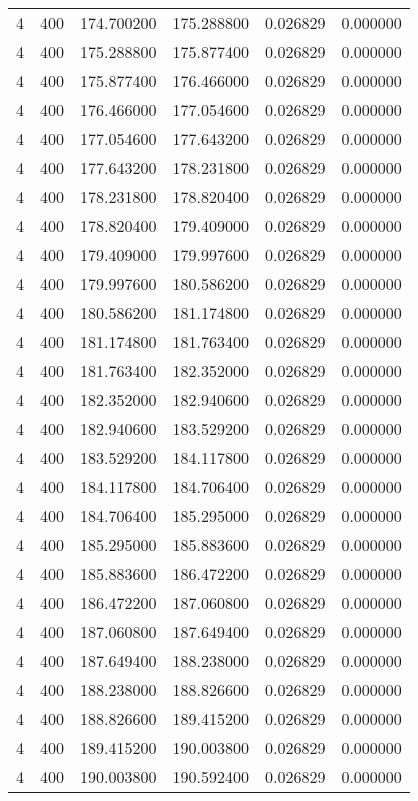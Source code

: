\begin{longtable}{rrrrrr}
4 & 400 & 174.700200 & 175.288800 & 0.026829 & 0.000000 \\
4 & 400 & 175.288800 & 175.877400 & 0.026829 & 0.000000 \\
4 & 400 & 175.877400 & 176.466000 & 0.026829 & 0.000000 \\
4 & 400 & 176.466000 & 177.054600 & 0.026829 & 0.000000 \\
4 & 400 & 177.054600 & 177.643200 & 0.026829 & 0.000000 \\
4 & 400 & 177.643200 & 178.231800 & 0.026829 & 0.000000 \\
4 & 400 & 178.231800 & 178.820400 & 0.026829 & 0.000000 \\
4 & 400 & 178.820400 & 179.409000 & 0.026829 & 0.000000 \\
4 & 400 & 179.409000 & 179.997600 & 0.026829 & 0.000000 \\
4 & 400 & 179.997600 & 180.586200 & 0.026829 & 0.000000 \\
4 & 400 & 180.586200 & 181.174800 & 0.026829 & 0.000000 \\
4 & 400 & 181.174800 & 181.763400 & 0.026829 & 0.000000 \\
4 & 400 & 181.763400 & 182.352000 & 0.026829 & 0.000000 \\
4 & 400 & 182.352000 & 182.940600 & 0.026829 & 0.000000 \\
4 & 400 & 182.940600 & 183.529200 & 0.026829 & 0.000000 \\
4 & 400 & 183.529200 & 184.117800 & 0.026829 & 0.000000 \\
4 & 400 & 184.117800 & 184.706400 & 0.026829 & 0.000000 \\
4 & 400 & 184.706400 & 185.295000 & 0.026829 & 0.000000 \\
4 & 400 & 185.295000 & 185.883600 & 0.026829 & 0.000000 \\
4 & 400 & 185.883600 & 186.472200 & 0.026829 & 0.000000 \\
4 & 400 & 186.472200 & 187.060800 & 0.026829 & 0.000000 \\
4 & 400 & 187.060800 & 187.649400 & 0.026829 & 0.000000 \\
4 & 400 & 187.649400 & 188.238000 & 0.026829 & 0.000000 \\
4 & 400 & 188.238000 & 188.826600 & 0.026829 & 0.000000 \\
4 & 400 & 188.826600 & 189.415200 & 0.026829 & 0.000000 \\
4 & 400 & 189.415200 & 190.003800 & 0.026829 & 0.000000 \\
4 & 400 & 190.003800 & 190.592400 & 0.026829 & 0.000000 \\

\end{longtable}
